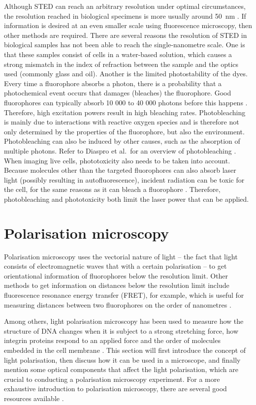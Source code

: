 Although STED can reach an arbitrary resolution under optimal circumstances, the resolution reached in biological specimens is more usually around 50~nm \cite{Wildanger2012,Muller2012}. If information is desired at an even smaller scale using fluorescence microscopy, then other methods are required.
There are several reasons the resolution of STED in biological samples has not been able to reach the single-nanometre scale. One is that these samples consist of cells in a water-based solution, which causes a strong mismatch in the index of refraction between the sample and the optics used (commonly glass and oil). Another is the limited photostability of the dyes. Every time a fluorophore absorbs a photon, there is a probability that a photochemical event occurs that damages (bleaches) the fluorophore. Good fluorophores can typically absorb 10 000 to 40 000 photons before this happens \cite{Lichtman2005}. Therefore, high excitation powers result in high bleaching rates. Photobleaching is mainly due to interactions with reactive oxygen species and is therefore not only determined by the properties of the fluorophore, but also the environment. Photobleaching can also be induced by other causes, such as the absorption of multiple photons. Refer to Diaspro et al.~for an overview of photobleaching \cite{Diaspro2006}. When imaging live cells, phototoxicity also needs to be taken into account. Because molecules other than the targeted fluorophores can also absorb laser light (possibly resulting in autofluorescence), incident radiation can be toxic for the cell, for the same reasons as it can bleach a fluorophore \cite{Lichtman2005}. Therefore, photobleaching and phototoxicity both limit the laser power that can be applied.


\section{Polarisation microscopy}

Polarisation microscopy uses the vectorial nature of light -- the fact that light consists of electromagnetic waves that with a certain polarisation -- to get orientational information of fluorophores below the resolution limit. Other methods to get information on distances below the resolution limit include fluorescence resonance energy transfer (FRET), for example, which is useful for measuring distances between two fluorophores on the order of nanometres \cite{Lerner2021}.

Among others, light polarisation microscopy has been used to measure how the structure of DNA changes when it is subject to a strong stretching force, how integrin proteins respond to an applied force and the order of molecules embedded in the cell membrane \cite{Backer2019, Nordenfelt2017, Swaminathan2017, Brasselet2013}. This section will first introduce the concept of light polarisation, then discuss how it can be used in a microscope, and finally mention some optical components that affect the light polarisation, which are crucial to conducting a polarisation microscopy experiment. For a more exhaustive introduction to polarisation microscopy, there are several good resources available \cite{Goldstein2011, Collett2005, Lakowicz2006}.

